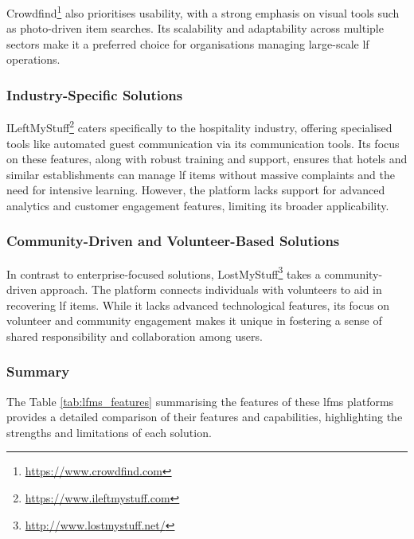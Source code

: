Crowdfind\footnote{\url{https://www.crowdfind.com}} also prioritises usability, with a strong emphasis on visual tools such as photo-driven item searches. Its scalability and adaptability across multiple sectors make it a preferred choice for organisations managing large-scale \ac{lf} operations.

\subsubsection{Industry-Specific Solutions} \label{subsubsec:industry-specific-solutions}

ILeftMyStuff\footnote{\url{https://www.ileftmystuff.com}} caters specifically to the hospitality industry, offering specialised tools like automated guest communication via its communication tools. Its focus on these features, along with robust training and support, ensures that hotels and similar establishments can manage \ac{lf} items without massive complaints and the need for intensive learning. However, the platform lacks support for advanced analytics and customer engagement features, limiting its broader applicability.

\subsubsection{Community-Driven and Volunteer-Based Solutions} \label{subsubsec:community-driven-solutions}

In contrast to enterprise-focused solutions, LostMyStuff\footnote{\url{http://www.lostmystuff.net/}} takes a community-driven approach. The platform connects individuals with volunteers to aid in recovering \ac{lf} items. While it lacks advanced technological features, its focus on volunteer and community engagement makes it unique in fostering a sense of shared responsibility and collaboration among users.

\subsubsection{Summary} \label{subsubsec:lfms_summary}

The Table \ref{tab:lfms_features} summarising the features of these \ac{lfms} platforms provides a detailed comparison of their features and capabilities, highlighting the strengths and limitations of each solution.


